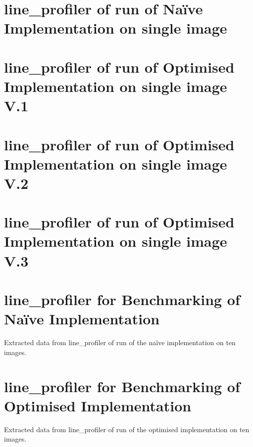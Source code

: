 \begin{landscape}

\chapter{line_profiler of run of Na\"ive Implementation on single image}
\label{AppLinePS1}



\chapter{line_profiler of run of Optimised Implementation on single image V.1}
\label{AppLinePS2}


\chapter{line_profiler of run of Optimised Implementation on single image V.2}
\label{AppLinePS22}


\chapter{line_profiler of run of Optimised Implementation on single image V.3}
\label{AppLinePS24}


\chapter{line_profiler for Benchmarking of Na\"ive Implementation}
\label{AppLinePS110}
Extracted data from line_profiler of run of the na\"ive implementation on ten images.



\chapter{line_profiler for Benchmarking of Optimised Implementation}
\label{AppLinePS210}
Extracted data from line_profiler of run of the optimised implementation on ten images.



\end{landscape}